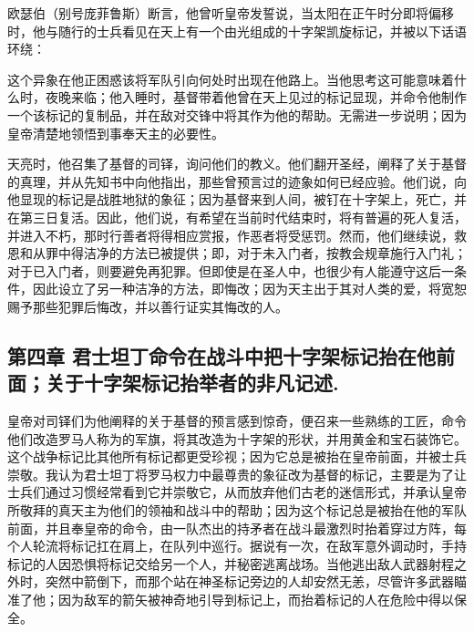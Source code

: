 欧瑟伯（别号庞菲鲁斯）断言，他曾听皇帝发誓说，当太阳在正午时分即将偏移时，他与随行的士兵看见在天上有一个由光组成的十字架凯旋标记，并被以下话语环绕：\par

这个异象在他正困惑该将军队引向何处时出现在他路上。当他思考这可能意味着什么时，夜晚来临；他入睡时，基督带着他曾在天上见过的标记显现，并命令他制作一个该标记的复制品，并在敌对交锋中将其作为他的帮助。无需进一步说明；因为皇帝清楚地领悟到事奉天主的必要性。\par

天亮时，他召集了基督的司铎，询问他们的教义。他们翻开圣经，阐释了关于基督的真理，并从先知书中向他指出，那些曾预言过的迹象如何已经应验。他们说，向他显现的标记是战胜地狱的象征；因为基督来到人间，被钉在十字架上，死亡，并在第三日复活。因此，他们说，有希望在当前时代结束时，将有普遍的死人复活，并进入不朽，那时行善者将得相应赏报，作恶者将受惩罚。然而，他们继续说，救恩和从罪中得洁净的方法已被提供；即，对于未入门者，按教会规章施行入门礼；对于已入门者，则要避免再犯罪。但即使是在圣人中，也很少有人能遵守这后一条件，因此设立了另一种洁净的方法，即悔改；因为天主出于其对人类的爱，将宽恕赐予那些犯罪后悔改，并以善行证实其悔改的人。\par


\subsection{第四章 君士坦丁命令在战斗中把十字架标记抬在他前面；关于十字架标记抬举者的非凡记述.}

皇帝对司铎们为他阐释的关于基督的预言感到惊奇，便召来一些熟练的工匠，命令他们改造罗马人称为的军旗，将其改造为十字架的形状，并用黄金和宝石装饰它。这个战争标记比其他所有标记都更受珍视；因为它总是被抬在皇帝前面，并被士兵崇敬。我认为君士坦丁将罗马权力中最尊贵的象征改为基督的标记，主要是为了让士兵们通过习惯经常看到它并崇敬它，从而放弃他们古老的迷信形式，并承认皇帝所敬拜的真天主为他们的领袖和战斗中的帮助；因为这个标记总是被抬在他的军队前面，并且奉皇帝的命令，由一队杰出的持矛者在战斗最激烈时抬着穿过方阵，每个人轮流将标记扛在肩上，在队列中巡行。据说有一次，在敌军意外调动时，手持标记的人因恐惧将标记交给另一个人，并秘密逃离战场。当他逃出敌人武器射程之外时，突然中箭倒下，而那个站在神圣标记旁边的人却安然无恙，尽管许多武器瞄准了他；因为敌军的箭矢被神奇地引导到标记上，而抬着标记的人在危险中得以保全。\par

